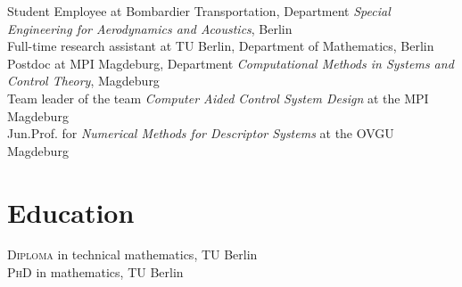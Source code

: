 Student Employee at Bombardier Transportation, Department \emph{Special Engineering for Aerodynamics and Acoustics}, Berlin\\
Full-time research assistant at TU Berlin, Department of Mathematics, Berlin\\
Postdoc at MPI Magdeburg, Department \emph{Computational Methods in Systems and Control Theory}, Magdeburg\\
Team leader of the team \emph{Computer Aided Control System Design} at the MPI Magdeburg\\
Jun.Prof. for \emph{Numerical Methods for Descriptor Systems} at the OVGU Magdeburg\\


\section*{Education}

\textsc{Diploma} in technical mathematics, TU Berlin\\
\textsc{PhD} in mathematics, TU Berlin

